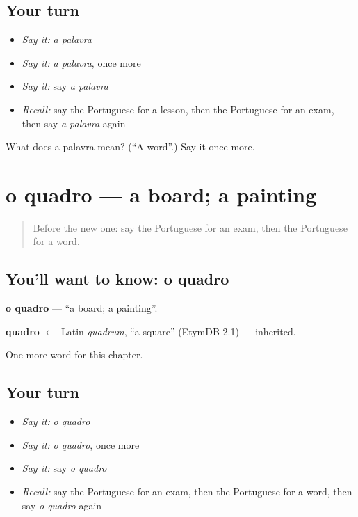 \subsection*{Your turn}
\begin{itemize}
\raggedright
  \item \emph{Say it:} \emph{a palavra}
  \item \emph{Say it:} \emph{a palavra}, once more
  \item \emph{Say it:} say \emph{a palavra}
  \item \emph{Recall:} say the Portuguese for a lesson, then the Portuguese for an exam, then say \emph{a palavra} again
\end{itemize}

\begin{tcolorbox}[breakable,colback=teal!4,colframe=teal!35!black,title={Before you move on}]
What does a palavra mean? (\textquotedblleft{}A word\textquotedblright{}.) Say it once more.
\end{tcolorbox}
\section[o quadro]{o quadro — a board; a painting}

\label{lesson:PT-C113-quadro}



\begin{quote}
Before the new one: say the Portuguese for an exam, then the Portuguese for a word.
\end{quote}

\subsection*{You'll want to know: o quadro}
\textbf{o quadro} — \textquotedblleft{}a board; a painting\textquotedblright{}.

\begin{cousinweb}
\textbf{quadro} $\leftarrow$ Latin \emph{quadrum}, \textquotedblleft{}a square\textquotedblright{} (EtymDB 2.1) — inherited.
\end{cousinweb}

\begin{grammarlens}[title={What you've built}]
One more word for this chapter.
\end{grammarlens}

\subsection*{Your turn}
\begin{itemize}
\raggedright
  \item \emph{Say it:} \emph{o quadro}
  \item \emph{Say it:} \emph{o quadro}, once more
  \item \emph{Say it:} say \emph{o quadro}
  \item \emph{Recall:} say the Portuguese for an exam, then the Portuguese for a word, then say \emph{o quadro} again
\end{itemize}

